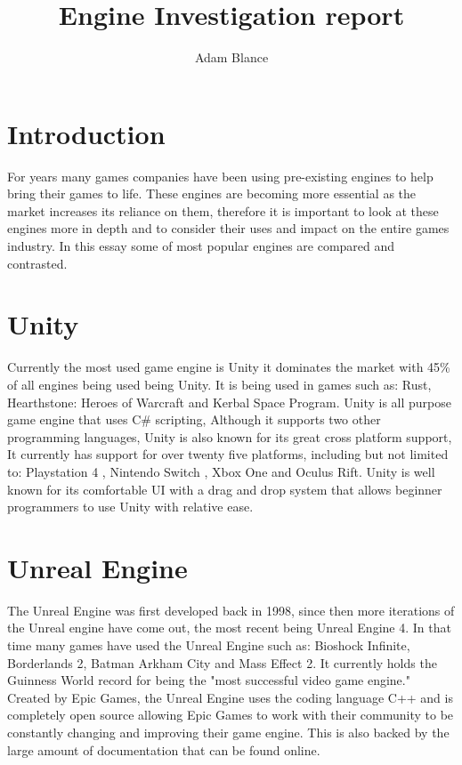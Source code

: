 \documentclass{article}
\begin{document}
\title{Engine Investigation report}
\author{Adam Blance}
\maketitle

\section{Introduction}
For years many games companies have been using pre-existing engines to help bring their games to life. These engines are becoming more essential as the market increases its reliance on them, therefore it is important to look at these engines more in depth and to consider their uses and impact on the entire games industry.  In this essay some of most popular engines are compared and contrasted. 

\section{Unity}
Currently the most used game engine is Unity it dominates the market with 45\% of all engines being used being Unity. It is being used in games such as: Rust, Hearthstone: Heroes of Warcraft and Kerbal Space Program.
\newline
Unity is all purpose game engine that uses C\# scripting, Although it supports two other programming languages, Unity is also known for its great cross platform support, It currently has support for over twenty five platforms, including but not limited to: Playstation 4 , Nintendo Switch , Xbox One and Oculus Rift. Unity is well known for its comfortable UI with a drag and drop system that allows beginner programmers to use Unity with relative ease. 

\section{Unreal Engine}
The Unreal Engine was first developed back in 1998, since then more iterations of the Unreal engine have come out, the most recent being Unreal Engine 4. In that time many games have used the Unreal Engine such as: Bioshock Infinite,  Borderlands 2, Batman Arkham City and Mass Effect 2. It currently holds the Guinness World record for being the "most successful video game engine."
\newline Created by Epic Games, the Unreal Engine uses the coding language C++ and is completely open source allowing Epic Games to work with their community to be constantly changing and improving their game engine. This is also backed by the large amount of documentation that can be found online.
\end{document}

